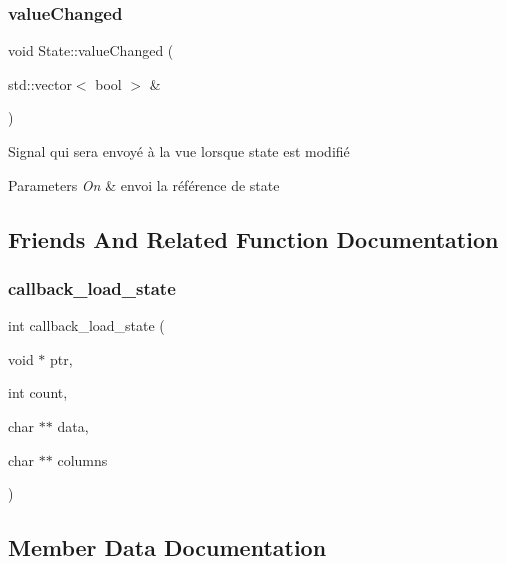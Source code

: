 \subsubsection{\texorpdfstring{value\+Changed}{valueChanged}}
{\footnotesize\ttfamily void State\+::value\+Changed (\begin{DoxyParamCaption}\item[{std\+::vector$<$ bool $>$ \&}]{ }\end{DoxyParamCaption})\hspace{0.3cm}{\ttfamily [signal]}}



Signal qui sera envoyé à la vue lorsque state est modifié 


\begin{DoxyParams}{Parameters}
{\em On} & envoi la référence de state \\
\hline
\end{DoxyParams}


\subsection{Friends And Related Function Documentation}
\mbox{\label{class_state_a62de6fe2f55d6e7c3af99e11f5bf3cad}} 
\subsubsection{\texorpdfstring{callback\+\_\+load\+\_\+state}{callback\_load\_state}}
{\footnotesize\ttfamily int callback\+\_\+load\+\_\+state (\begin{DoxyParamCaption}\item[{void $\ast$}]{ptr,  }\item[{int}]{count,  }\item[{char $\ast$$\ast$}]{data,  }\item[{char $\ast$$\ast$}]{columns }\end{DoxyParamCaption})\hspace{0.3cm}{\ttfamily [friend]}}



\subsection{Member Data Documentation}
\mbox{\label{class_state_a94feee6145041e8521a7c94f3e416887}} 
